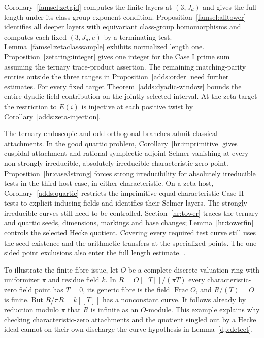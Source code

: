 \begin{description}
Corollary~\ref{famsel:zetajd} computes the finite layers at \((3,J_d)\)
and gives the full length under its class-group exponent condition.
Proposition~\ref{famsel:alltower} identifies all deeper layers with
equivariant class-group homomorphisms and computes each fixed
\((3,J_d,e)\) by a terminating test. Lemma~\ref{famsel:zetaclasssample}
exhibits normalized length one.
Proposition~\ref{zetaring:integer} gives one integer for the Case I
prime sum assuming the ternary trace-product assertion. The remaining
matching-parity entries outside the three ranges in
Proposition~\ref{adds:order} need further estimates. For every fixed
target Theorem~\ref{adds:dyadic-window} bounds the entire dyadic
field contribution on the jointly selected interval. At the zeta
target the restriction to \(E(i)\) is injective at each positive twist
by Corollary~\ref{adds:zeta-injection}.

The ternary endoscopic and odd orthogonal branches admit classical
attachments. In the good quartic problem, Corollary~\ref{hr:imprimitive}
gives cuspidal attachment and rational symplectic adjoint Selmer
vanishing at every non-strongly-irreducible, absolutely irreducible
characteristic-zero point. Proposition~\ref{hr:case3strong} forces
strong irreducibility for absolutely irreducible tests in the third
host case, in either characteristic. On a zeta host,
Corollary~\ref{adds:quartic} restricts the imprimitive equal-characteristic
Case II tests to explicit inducing fields and identifies their Selmer
layers. The strongly irreducible curves still need to be controlled.
Section~\ref{hr:tower} traces the ternary and quartic seeds,
dimensions, markings and base changes; Lemma~\ref{hr:towerfin}
controls the selected Hecke quotient. Covering every required test
curve still uses the seed existence and the arithmetic transfers at
the specialized points. The one-sided point exclusions also enter
the full length estimate.
.

\end{description}

To illustrate the finite-fibre issue, let \(O\) be a complete discrete valuation ring with uniformizer \(\pi\) and residue field \(k\). In \(R=O[[T]]/(\pi T)\) every characteristic-zero field point has \(T=0\), its generic fibre is the field \(\operatorname{Frac}O\), and \(R/(T)=O\) is finite. But \(R/\pi R=k[[T]]\) has a nonconstant curve. It follows already by reduction modulo \(\pi\) that \(R\) is infinite as an \(O\)-module. This example explains why checking characteristic-zero attachments and the quotient singled out by a Hecke ideal cannot on their own discharge the curve hypothesis in Lemma~\ref{dp:detect}.


